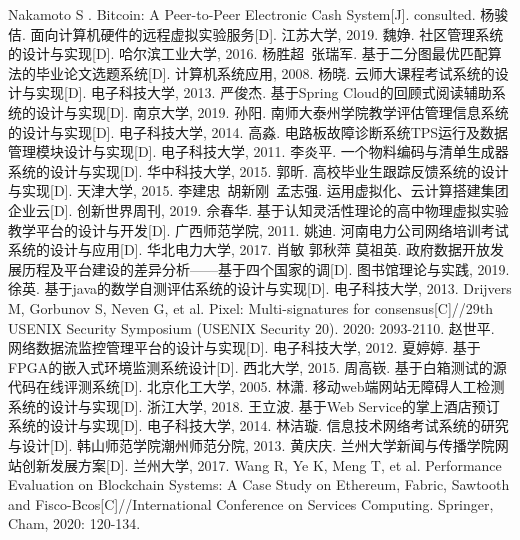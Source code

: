 \begin{thebibliography}{99}

Nakamoto S . Bitcoin: A Peer-to-Peer Electronic Cash System[J]. consulted.
杨骏佶. 面向计算机硬件的远程虚拟实验服务[D]. 江苏大学, 2019.
魏婙. 社区管理系统的设计与实现[D]. 哈尔滨工业大学, 2016.
杨胜超~张瑞军. 基于二分图最优匹配算法的毕业论文选题系统[D]. 计算机系统应用, 2008.
杨晓. 云师大课程考试系统的设计与实现[D]. 电子科技大学, 2013.
严俊杰. 基于Spring Cloud的回顾式阅读辅助系统的设计与实现[D]. 南京大学, 2019.
孙阳. 南师大泰州学院教学评估管理信息系统的设计与实现[D]. 电子科技大学, 2014.
高淼. 电路板故障诊断系统TPS运行及数据管理模块设计与实现[D]. 电子科技大学, 2011.
李炎平. 一个物料编码与清单生成器系统的设计与实现[D]. 华中科技大学, 2015.
郭昕. 高校毕业生跟踪反馈系统的设计与实现[D]. 天津大学, 2015.
李建忠~胡新刚~孟志强. 运用虚拟化、云计算搭建集团企业云[D]. 创新世界周刊, 2019.
佘春华. 基于认知灵活性理论的高中物理虚拟实验教学平台的设计与开发[D]. 广西师范学院, 2011.
姚迪. 河南电力公司网络培训考试系统的设计与应用[D]. 华北电力大学, 2017.
肖敏 郭秋萍 莫祖英. 政府数据开放发展历程及平台建设的差异分析——基于四个国家的调[D]. 图书馆理论与实践, 2019.
徐英. 基于java的数学自测评估系统的设计与实现[D]. 电子科技大学, 2013.
Drijvers M, Gorbunov S, Neven G, et al. Pixel: Multi-signatures for consensus[C]//29th {USENIX} Security Symposium ({USENIX} Security 20). 2020: 2093-2110.
赵世平. 网络数据流监控管理平台的设计与实现[D]. 电子科技大学, 2012.
夏婷婷. 基于FPGA的嵌入式环境监测系统设计[D]. 西北大学, 2015.
周高嵚. 基于白箱测试的源代码在线评测系统[D]. 北京化工大学, 2005.
林潇. 移动web端网站无障碍人工检测系统的设计与实现[D]. 浙江大学, 2018.
王立波. 基于Web Service的掌上酒店预订系统的设计与实现[D]. 电子科技大学, 2014.
林洁璇. 信息技术网络考试系统的研究与设计[D]. 韩山师范学院潮州师范分院, 2013.
黄庆庆. 兰州大学新闻与传播学院网站创新发展方案[D]. 兰州大学, 2017.
Wang R, Ye K, Meng T, et al. Performance Evaluation on Blockchain Systems: A Case Study on Ethereum, Fabric, Sawtooth and Fisco-Bcos[C]//International Conference on Services Computing. Springer, Cham, 2020: 120-134.

\end{thebibliography}